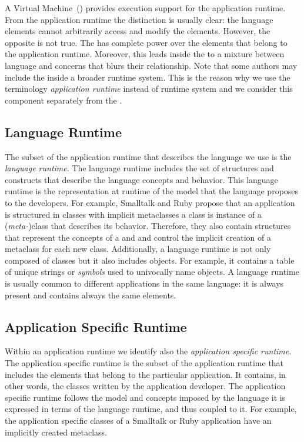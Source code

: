 A Virtual Machine~(\VM) provides execution support for the application runtime. From the application runtime the distinction is usually clear: the language elements cannot arbitrarily access and modify the \VM elements. However, the opposite is not true. The \VM has complete power over the elements that belong to the application runtime. Moreover, this leads inside the \VM to a mixture between language and \VM concerns that blurs their relationship.
Note that some authors may include the \VM inside a broader runtime system.
This is the reason why we use the terminology \emph{application runtime} instead of runtime system and we consider this component separately from the \VM.

\subsection{Language Runtime}

The subset of the application runtime that describes the language we use is the \emph{language runtime}. The language runtime includes the set of structures and constructs that describe the language concepts and behavior. This language runtime is the representation at runtime of the model that the language proposes to the developers. For example, Smalltalk and Ruby propose that an application is structured in classes with implicit metaclasses \ie a class is instance of a (\emph{meta-})class that describes its behavior. Therefore, they also contain structures that represent the concepts of a  and  and control the implicit creation of a metaclass for each new class. Additionally, a language runtime is not only composed of classes but it also includes objects. For example, it contains a table of unique strings or \emph{symbols} used to univocally name objects. A language runtime is usually common to different applications in the same language: it is always present and contains always the same elements.

\subsection{Application Specific Runtime}

Within an application runtime we identify also the \emph{application specific runtime}. The application specific runtime is the subset of the application runtime that includes the elements that belong to the particular application. It contains, in other words, the classes written by the application developer. The application specific runtime follows the model and concepts imposed by the language \ie it is expressed in terms of the language runtime, and thus coupled to it. For example, the application specific classes of a Smalltalk or Ruby application have an implicitly created metaclass.


